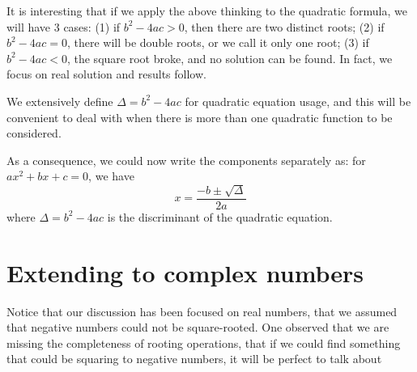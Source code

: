 \documentclass[12pt]{article}
\begin{document}
    It is interesting that if we apply the above thinking to the quadratic formula, we will have 3 cases: (1) if $b^2-4ac>0$, then there are two distinct roots; (2) if $b^2-4ac=0$, there will be double roots, or we call it only one root; (3) if $b^2-4ac<0$, the square root broke, and no solution can be found. In fact, we focus on real solution and results follow.

    We extensively define $\Delta=b^2-4ac$ for quadratic equation usage, and this will be convenient to deal with when there is more than one quadratic function to be considered.

    As a consequence, we could now write the components separately as: for $ax^2+bx+c=0$, we have $$x=\frac{-b\pm\sqrt{\Delta}}{2a}$$ where $\Delta=b^2-4ac$ is the discriminant of the quadratic equation.

    \section*{Extending to complex numbers}
    Notice that our discussion has been focused on real numbers, that we assumed that negative numbers could not be square-rooted. One observed that we are missing the completeness of rooting operations, that if we could find something that could be squaring to negative numbers, it will be perfect to talk about 
\end{document}
